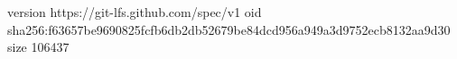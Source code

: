version https://git-lfs.github.com/spec/v1
oid sha256:f63657be9690825fcfb6db2db52679be84dcd956a949a3d9752ecb8132aa9d30
size 106437
